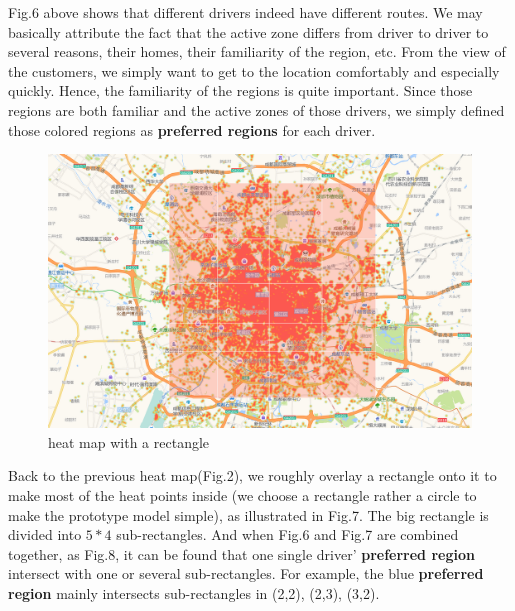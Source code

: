 \documentclass[10pt,journal]{IEEEtran}
\begin{document}
Fig.6 above shows that different drivers indeed have different routes. We may basically attribute the fact that the active zone differs from driver to driver to several reasons, their homes, their familiarity of the region, etc. From the view of the customers, we simply want to get to the location comfortably and especially quickly. Hence, the familiarity of the regions is quite important. Since those regions are both familiar and the active zones of those drivers, we simply defined those colored regions as \textbf{preferred regions} for each driver.

 
 \begin{figure}[!ht]
    \centering
    \includegraphics[width=1.0\columnwidth]{Fig/region.png}
    \caption{heat map with a rectangle}
 \end{figure}
 
 Back to the previous heat map(Fig.2), we roughly overlay a rectangle onto it to make most of the heat points inside (we choose a rectangle rather a circle to make the prototype model simple), as illustrated in Fig.7. The big rectangle is divided into $5*4$ sub-rectangles. And when Fig.6 and Fig.7 are combined together, as Fig.8, it can be found that one single driver' \textbf{preferred region} intersect with one or several sub-rectangles. For example, the blue \textbf{preferred region} mainly intersects sub-rectangles in (2,2), (2,3), (3,2).
\end{document}
